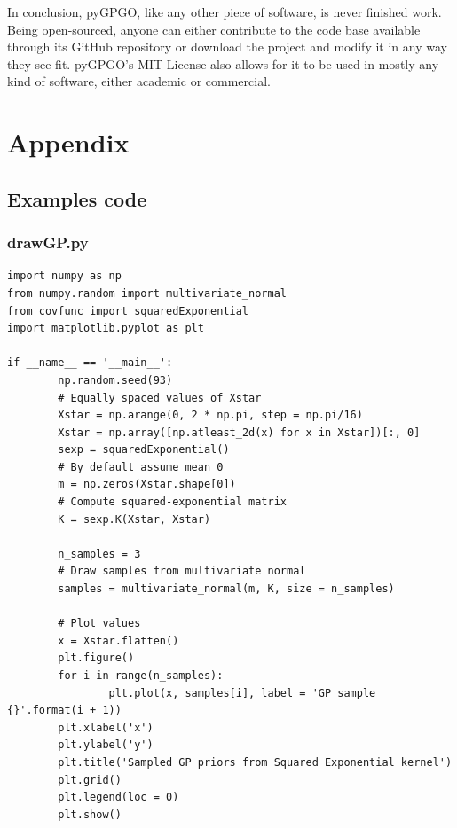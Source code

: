 \documentclass[10pt,a4paper,twoside]{book}
\begin{document}
In conclusion, pyGPGO, like any other piece of software, is never finished work. Being open-sourced, anyone can either contribute to the code base available through its GitHub repository or download the project and modify it in any way they see fit. pyGPGO's MIT License also allows for it to be used in mostly any kind of software, either academic or commercial.

\chapter*{Appendix}
\section*{Examples code}
\subsection*{drawGP.py}
\label{drawGP}
\begin{verbatim}
import numpy as np
from numpy.random import multivariate_normal
from covfunc import squaredExponential
import matplotlib.pyplot as plt

if __name__ == '__main__':
        np.random.seed(93)
        # Equally spaced values of Xstar
        Xstar = np.arange(0, 2 * np.pi, step = np.pi/16)
        Xstar = np.array([np.atleast_2d(x) for x in Xstar])[:, 0]
        sexp = squaredExponential()
        # By default assume mean 0
        m = np.zeros(Xstar.shape[0])
        # Compute squared-exponential matrix
        K = sexp.K(Xstar, Xstar)

        n_samples = 3
        # Draw samples from multivariate normal
        samples = multivariate_normal(m, K, size = n_samples)

        # Plot values
        x = Xstar.flatten()
        plt.figure()
        for i in range(n_samples):
                plt.plot(x, samples[i], label = 'GP sample {}'.format(i + 1))
        plt.xlabel('x')
        plt.ylabel('y')
        plt.title('Sampled GP priors from Squared Exponential kernel')
        plt.grid()
        plt.legend(loc = 0)
        plt.show()	
\end{verbatim}
\end{document}
